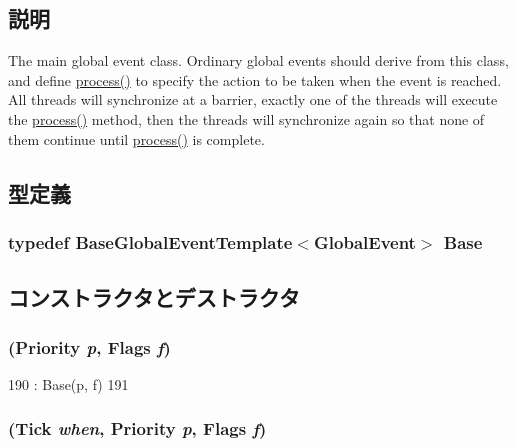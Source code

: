 \subsection{説明}
The main global event class. Ordinary global events should derive from this class, and define \hyperlink{classGlobalEvent_a142b75b68a6291400e20fb0dd905b1c8}{process()} to specify the action to be taken when the event is reached. All threads will synchronize at a barrier, exactly one of the threads will execute the \hyperlink{classGlobalEvent_a142b75b68a6291400e20fb0dd905b1c8}{process()} method, then the threads will synchronize again so that none of them continue until \hyperlink{classGlobalEvent_a142b75b68a6291400e20fb0dd905b1c8}{process()} is complete. 

\subsection{型定義}
\hypertarget{classGlobalEvent_a20e777cac0612b0f7713b46884762e3f}{
\subsubsection[{Base}]{\setlength{\rightskip}{0pt plus 5cm}typedef {\bf BaseGlobalEventTemplate}$<${\bf GlobalEvent}$>$ {\bf Base}}}
\label{classGlobalEvent_a20e777cac0612b0f7713b46884762e3f}


\subsection{コンストラクタとデストラクタ}
\hypertarget{classGlobalEvent_a28d42a7a12d6603c52d0c22134038676}{
\subsubsection[{GlobalEvent}]{ ({\bf Priority} {\em p}, \/  {\bf Flags} {\em f})}}
\label{classGlobalEvent_a28d42a7a12d6603c52d0c22134038676}



\begin{DoxyCode}
190         : Base(p, f)
191     { }
\end{DoxyCode}
\hypertarget{classGlobalEvent_a89acea2fd06692ad052931b6dd1ebc8e}{
\subsubsection[{GlobalEvent}]{ ({\bf Tick} {\em when}, \/  {\bf Priority} {\em p}, \/  {\bf Flags} {\em f})}}
\label{classGlobalEvent_a89acea2fd06692ad052931b6dd1ebc8e}




